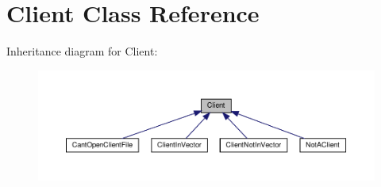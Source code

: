 \hypertarget{class_client}{}\section{Client Class Reference}
\label{class_client}


Inheritance diagram for Client\+:\nopagebreak
\begin{figure}[H]
\begin{center}
\leavevmode
\includegraphics[width=350pt]{class_client__inherit__graph}
\end{center}
\end{figure}
